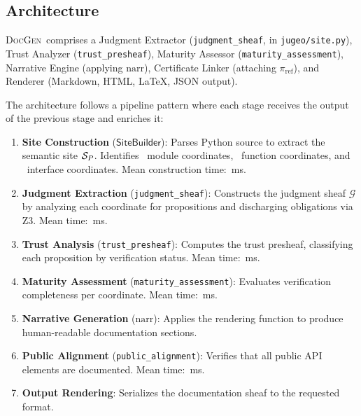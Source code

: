 \documentclass[11pt]{article}
\newcommand{\DocGen}{\textsc{DocGen}}
\newcommand{\JudgmentSheafAPI}{\texttt{judgment\_sheaf}}
\newcommand{\TrustPresheafAPI}{\texttt{trust\_presheaf}}
\newcommand{\MaturityAPI}{\texttt{maturity\_assessment}}
\newcommand{\PublicAlignAPI}{\texttt{public\_alignment}}
\newcommand{\CertRef}{\pi_{\mathrm{ref}}}
\newcommand{\NarrFunc}{\mathrm{narr}}
\begin{document}
\subsection{Architecture}
\DocGen\ comprises a Judgment Extractor (\JudgmentSheafAPI, in
\texttt{jugeo/site.py}), Trust Analyzer (\TrustPresheafAPI), Maturity
Assessor (\MaturityAPI), Narrative Engine (applying $\NarrFunc$),
Certificate Linker (attaching $\CertRef$), and Renderer (Markdown,
HTML, LaTeX, JSON output).

The architecture follows a pipeline pattern where each stage receives
the output of the previous stage and enriches it:

\begin{enumerate}[noitemsep]
\item \textbf{Site Construction} ($\mathsf{SiteBuilder}$):
  Parses Python source to extract the semantic site $\mathcal{S}_P$.
  Identifies \suppCoordModuleCount\ module coordinates, \suppCoordFunctionCount\
  function coordinates, and \suppCoordInterfaceCount\ interface coordinates.
  Mean construction time: \compSiteMeanBuildMs\,ms.

\item \textbf{Judgment Extraction} (\JudgmentSheafAPI):
  Constructs the judgment sheaf $\mathcal{G}$ by analyzing each
  coordinate for propositions and discharging obligations via Z3.
  Mean time: \compProfJudgmentSheafMeanMs\,ms.

\item \textbf{Trust Analysis} (\TrustPresheafAPI):
  Computes the trust presheaf, classifying each proposition by
  verification status.  Mean time: \compProfTrustPresheafMeanMs\,ms.

\item \textbf{Maturity Assessment} (\MaturityAPI):
  Evaluates verification completeness per coordinate.  Mean time:
  \compProfMaturityAssessmentMeanMs\,ms.

\item \textbf{Narrative Generation} ($\NarrFunc$):
  Applies the rendering function to produce human-readable
  documentation sections.

\item \textbf{Public Alignment} (\PublicAlignAPI):
  Verifies that all public API elements are documented.  Mean time:
  \compProfPublicAlignmentMeanMs\,ms.

\item \textbf{Output Rendering}:
  Serializes the documentation sheaf to the requested format.
\end{enumerate}
\end{document}

